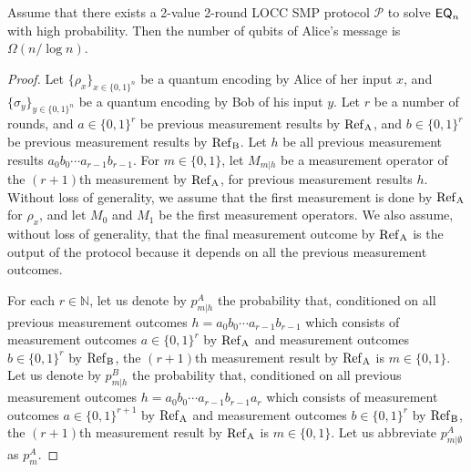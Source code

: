 \begin{proposition}\label{prop:warm-up}
    Assume that there exists a 2-value 2-round LOCC SMP protocol $\mathcal{P}$ to solve $\mathsf{EQ}_n$ with high probability. Then the number of qubits of Alice's message
    is $\Omega(n/\log n)$.
\end{proposition}

\begin{proof}
    Let $\{\rho_x\}_{x\in \{0,1\}^n}$ be a quantum encoding by Alice of her input $x$, and $\{\sigma_y\}_{y \in \{0,1\}^n}$ be a quantum encoding by Bob of his input $y$.
    Let $r$ be a number of rounds, and $a \in \{0,1\}^{r}$ be previous measurement results by $\rm{Ref}_A$, and $b \in \{0,1\}^{r}$ be previous measurement results by $\rm{Ref}_B$. Let $h$ be all previous measurement results $a_0b_0\cdots a_{r-1}b_{r-1}$. For $m \in \{0,1\}$, let $M_{m|h}$ be a measurement operator of the $(r+1)$th measurement by $\rm{Ref}_A$, for previous measurement results $h$. Without loss of generality, we assume that the first measurement is done by $\rm{Ref}_A$ for $\rho_x$, and let $M_0$ and $M_1$ be the first measurement operators. We also assume, without loss of generality, that the final measurement outcome by $\rm{Ref}_A$ is the output of the protocol because it depends on all the previous measurement outcomes.
    
    For each $r \in \mathbb{N}$, let us denote by $p^A_{m|h}$ the probability that, conditioned on all previous measurement outcomes $h = a_0 b_0\cdots a_{r-1} b_{r-1}$ which consists of measurement outcomes $a \in \{0,1\}^r$ by $\rm{Ref}_A$ and measurement outcomes $b \in \{0,1\}^r$ by $\rm{Ref}_B$, the $(r+1)$th measurement result by $\rm{Ref}_A$ is $m \in \{0,1\}$. Let us denote by $p^B_{m|h}$ the probability that, conditioned on all previous measurement outcomes $h = a_0 b_0\cdots a_{r-1} b_{r-1} a_r$ which consists of measurement outcomes $a \in \{0,1\}^{r+1}$ by $\rm{Ref}_A$ and measurement outcomes $b \in \{0,1\}^r$ by $\rm{Ref}_B$, the $(r+1)$th measurement result by $\rm{Ref}_A$ is $m \in \{0,1\}$. Let us abbreviate $p^A_{m|\emptyset}$ as $p^A_m$. 
     

\end{proof}
